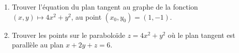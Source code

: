 \documentclass[a4paper]{tp_um}
\begin{document}
	
	\exo{} \begin{enumerate}
	\item Trouver l'équation du plan tangent au graphe de la fonction $(x,y) \mapsto 4x^2 + y^2$, au point $(x_0,y_0) = (1,-1)$.
	\blanc{8cm}	
	\item Trouver les points sur le paraboloïde $z=4x^2+y^2$ où le plan tangent est parallèle au plan $x+2y+z=6$.
		
\blanc{8cm}
\end{enumerate}	
	
\end{document}
